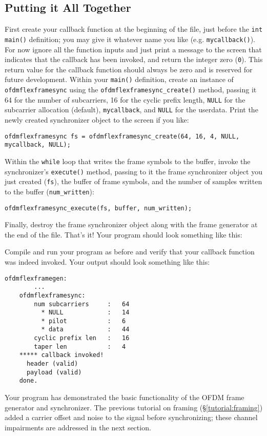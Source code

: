 %
%
\subsection{Putting it All Together}
\label{tutorial:ofdmflexframe:xxx}
First create your callback function at the beginning of the file, just
before the {\tt int main()} definition;
you may give it whatever name you like (e.g. {\tt mycallback()}).
For now ignore all the function inputs and just print a message to the
screen that indicates that the callback has been invoked,
and return the integer zero ({\tt 0}).
This return value for the callback function should always be zero
and is reserved for future development.
Within your {\tt main()} definition, create an instance of
{\tt ofdmflexframesync} using the {\tt ofdmflexframesync\_create()}
method, passing it
  64 for the number of subcarriers,
  16 for the cyclic prefix length,
  {\tt NULL} for the subcarrier allocation (default),
  {\tt mycallback}, and
  {\tt NULL} for the userdata.
Print the newly created synchronizer object to the screen if you like:
%
\begin{Verbatim}[fontsize=\small]
    ofdmflexframesync fs = ofdmflexframesync_create(64, 16, 4, NULL, mycallback, NULL);
\end{Verbatim}
%
Within the {\tt while} loop that writes the frame symbols to the buffer,
invoke the synchronizer's {\tt execute()} method,
passing to it the frame synchronizer object you just created ({\tt fs}),
the buffer of frame symbols,
and the number of samples written to the buffer ({\tt num\_written}):
%
\begin{Verbatim}[fontsize=\small]
    ofdmflexframesync_execute(fs, buffer, num_written);
\end{Verbatim}
%
Finally, destroy the frame synchronizer object along with the frame
generator at the end of the file.
That's it!
Your program should look something like this:
%

%
Compile and run your program as before and verify that your callback
function was indeed invoked.
Your output should look something like this:
%
\begin{Verbatim}[fontsize=\small]
    ofdmflexframegen:
        ...
    ofdmflexframesync:
        num subcarriers     :   64
          * NULL            :   14
          * pilot           :   6
          * data            :   44
        cyclic prefix len   :   16
        taper len           :   4
    ***** callback invoked!
      header (valid)
      payload (valid)
    done.
\end{Verbatim}
%
Your program has demonstrated the basic functionality of the OFDM frame
generator and synchronizer.
The previous tutorial on framing (\S\ref{tutorial:framing}) added
a carrier offset and noise to the signal before synchronizing;
these channel impairments are addressed in the next section.
%
%

